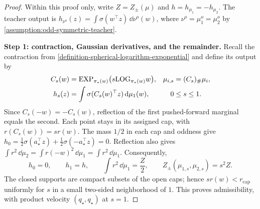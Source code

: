 \begin{proof}
Within this proof only, write \(Z=Z_\pm(\mu)\) and
\(h=h_{\mu_1}=-h_{\mu_2}\). The teacher output is
\(h_{\nu^o}(z)=\int\sigma(w^\top z)\,\dd\nu^o(w)\), where
\(\nu^o=\mu_1^o=\mu_2^o\) by \cref{assumption:odd-symmetric-teacher}.

\par\noindent\textbf{Step 1: contraction, Gaussian derivatives, and the remainder.}
Recall the contraction from \cref{definition-spherical-logarithm-exponential}
and define its output by
\begin{equation}
\label{eq:mf-pole-contraction-path}
\begin{aligned}
 C_s(w)&=\mathrm{EXP}_{\pi_\star(w)}\bigl(s\mathrm{LOG}_{\pi_\star(w)}w\bigr),
 &\mu_{i,s}&=(C_s)_\#\mu_i,\\
 h_s(z)&=\int\sigma(C_s(w)^\top z)\,\dd\mu_1(w),
 &0&\le s\le1.
\end{aligned}
\end{equation}
Since \(C_s(-w)=-C_s(w)\), reflection of the first pushed-forward
marginal equals the second. Each point stays in its assigned cap, with
\(r(C_s(w))=s r(w)\). The mass \(1/2\) in each cap and oddness give
\(h_0=\tfrac12\sigma(a_\star^\top z)+
\tfrac12\sigma(-a_\star^\top z)=0\). Reflection also gives
\(\int r^2\,\dd\mu_2=\int r(-w)^2\,\dd\mu_1=\int r^2\,\dd\mu_1\).
Consequently,
\begin{equation}
\label{eq:mf-contraction-endpoint-identities}
 h_0=0,\qquad h_1=h,\qquad
 \int r^2\,\dd\mu_1=\frac Z2,\qquad
 Z_\pm(\mu_{1,s},\mu_{2,s})=s^2Z.
\end{equation}
The closed supports are compact subsets of the open caps; hence
\(s r(w)<r_{\mathrm{cap}}\) uniformly for \(s\) in a small two-sided
neighborhood of \(1\). This proves admissibility, with product velocity
\((q_\star,q_\star)\) at \(s=1\).


\end{proof}
